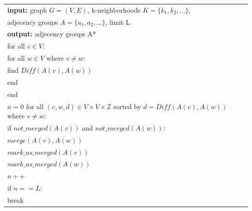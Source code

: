 \begin{center}
	\begin{tabular}{l}
    	{\bf input:} graph $G=(V,E)$, k-neighborhoods $K= \{k_{1}, k_{2}, ...\}$, \\
        \hspace{12 mm} adjecency groups $A=\{a_{1}, a_{2}, ...\}$, limit L \\
        {\bf output:} adjecency groups A* \\
        for all $v \in V$: \\
        \hspace{5 mm} for all $w \in V$ where $v \neq w$: \\
        \hspace{10 mm} find $Diff(A(v), A(w))$ \\
        \hspace{5 mm} end \\
        end \\
        $n = 0$
        for all $(v,w,d) \in V \times V \times \mathbb{Z}$ sorted by $d=Diff(A(v), A(w))$ where $v \neq w$: \\
        \hspace{5 mm} if $not\_merged(A(v))$ and $not\_merged(A(w))$:  \\
        \hspace{10 mm} $merge(A(v),A(w))$ \\
        \hspace{10 mm} $mark\_as\_merged(A(v))$ \\
        \hspace{10 mm} $mark\_as\_merged(A(w))$ \\
        \hspace{10 mm} $n++$ \\
        \hspace{10 mm} if $n == L$: \\
        \hspace{15 mm} break \\
    \end{tabular}
\end{center}
